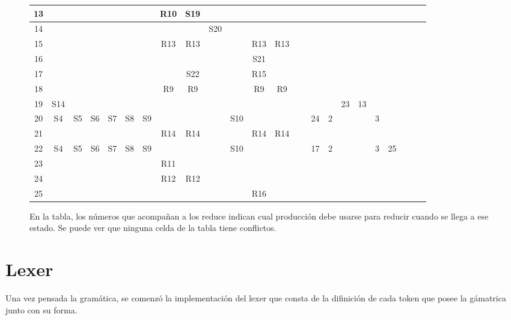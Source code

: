 \documentclass{article}
\begin{document}
\begin{figure}
\begin{center}
\begin{tabular}{ |c|c|c|c|c|c|c|c|c|c|c|c|c|c|c|c|c|c|c|c|c|c|c| }
			13 &   &   &   &   &   &   & R10 & S19 &   &   &   &   &   &   &   &   &   &   &  \\ \hline 
			14 &   &   &   &   &   &   &   &   & S20 &   &   &   &   &   &   &   &   &   &  \\ \hline 
			15 &   &   &   &   &   &   & R13 & R13 &   &   & R13 & R13 &   &   &   &   &   &   &  \\ \hline 
			16 &   &   &   &   &   &   &   &   &   &   & S21 &   &   &   &   &   &   &   &  \\ \hline 
			17 &   &   &   &   &   &   &   & S22 &   &   & R15 &   &   &   &   &   &   &   &  \\ \hline 
			18 &   &   &   &   &   &   & R9 & R9 &   &   & R9 & R9 &   &   &   &   &   &   &  \\ \hline 
			19 & S14 &   &   &   &   &   &   &   &   &   &   &   &   &   &   & 23 & 13 &   &  \\ \hline 
			20 & S4 & S5 & S6 & S7 & S8 & S9 &   &   &   & S10 &   &   &   & 24 & 2 &   &   & 3 &  \\ \hline 
			21 &   &   &   &   &   &   & R14 & R14 &   &   & R14 & R14 &   &   &   &   &   &   &  \\ \hline 
			22 & S4 & S5 & S6 & S7 & S8 & S9 &   &   &   & S10 &   &   &   & 17 & 2 &   &   & 3 & 25\\ \hline 
			23 &   &   &   &   &   &   & R11 &   &   &   &   &   &   &   &   &   &   &   &  \\ \hline 
			24 &   &   &   &   &   &   & R12 & R12 &   &   &   &   &   &   &   &   &   &   &  \\ \hline 
			25 &   &   &   &   &   &   &   &   &   &   & R16 &   &   &   &   &   &   &   &  \\ \hline 	
\end{tabular}

\vspace*{1cm}
\begin{minipage}{0.3\textwidth}
En la tabla, los números que acompañan a los reduce indican cual producción debe usarse para reducir cuando se llega a ese estado. Se puede ver que ninguna celda de la tabla tiene conflictos.
\end{minipage}
\end{center}
\end{figure}

\newpage
\section{Lexer}
Una vez pensada la gramática, se comenzó la implementación del lexer que consta de la difinición de cada token que posee la gámatrica junto con su forma. 
\end{document}

